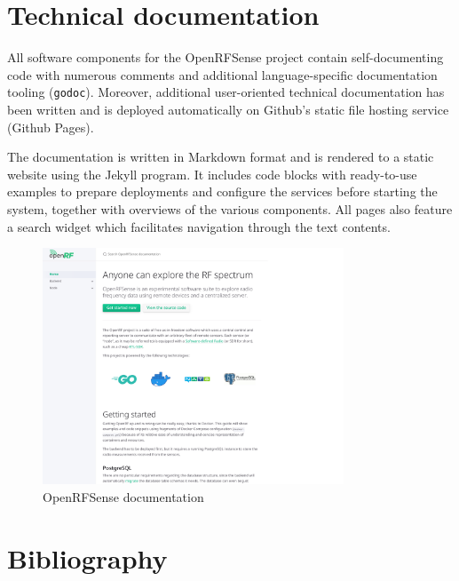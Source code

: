 \documentclass[
  letterpaper,
  a4paper,
  12pt,
  titlepage,
  oneside,
  openany]{book}
\begin{document}

\hypertarget{sec-techDoc}{%
\chapter{Technical documentation}\label{sec-techDoc}}

All software components for the OpenRFSense project contain
self-documenting code with numerous comments and additional
language-specific documentation tooling (\texttt{godoc}). Moreover,
additional user-oriented technical documentation has been written and is
deployed automatically on Github's static file hosting service (Github
Pages).

The documentation is written in Markdown format and is rendered to a
static website using the Jekyll program. It includes code blocks with
ready-to-use examples to prepare deployments and configure the services
before starting the system, together with overviews of the various
components. All pages also feature a search widget which facilitates
navigation through the text contents.

\begin{figure}[h!]

{\centering \includegraphics[width=0.8\textwidth,height=\textheight]{assets/screenshots/docs.pdf}

}

\caption{OpenRFSense documentation}

\end{figure}


\hypertarget{bibliography}{%
\chapter*{Bibliography}\label{bibliography}}
\end{document}
